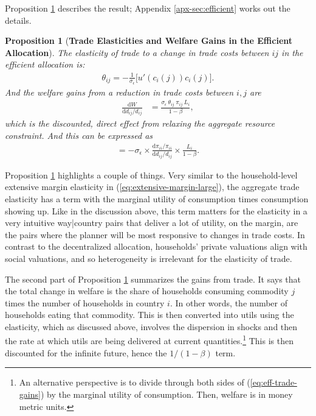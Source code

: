 \documentclass[12pt,pdftex]{article}
\newtheorem{prp}{Proposition}
\begin{document}
\begin{onehalfspacing}
Proposition \ref{prp:gains-efficient-allocation} describes the result; Appendix \ref{apx-sec:efficient} works out the details.

\begin{prp}[\textbf{Trade Elasticities and Welfare Gains in the Efficient Allocation}]\label{prp:gains-efficient-allocation} The elasticity of trade to a change in trade costs between $ij$ in the efficient allocation is:
\begin{align}
\theta_{ij} =  -\frac{1}{\sigma_{\epsilon}} \bigg [ u'(c_{i}(j)) c_{i}(j) \bigg]. \label{eq:eff-trade-elasticity}
\end{align}
And the welfare gains from a reduction in trade costs between $i,j$ are
\begin{align}
\frac{\mathrm{d} W }{\mathrm{d} d_{ij} / d_{ij}} &= \frac{\sigma_{\epsilon} \  \theta_{ij} \  \pi_{ij} \ L_i}{1-\beta},
\label{eq:eff-trade-gains}
\end{align}
which is the discounted, direct effect from relaxing the aggregate resource constraint. And this can be expressed as
\begin{align}
= -\sigma_{\epsilon} \times \frac{\mathrm{d} \pi_{ii} / \pi_{ii}}{\mathrm{d} d_{ij} / d_{ij}} \times \frac{L_i}{1 - \beta}.
\label{eq:eff-trade-gains-acr}
\end{align}
\end{prp}
Proposition \ref{prp:gains-efficient-allocation} highlights a couple of things. Very similar to the household-level extensive margin elasticity in (\ref{eq:extensive-margin-large}), the aggregate trade elasticity has a term with the marginal utility of consumption times consumption showing up. Like in the discussion above, this term matters for the elasticity in a very intuitive way|country pairs that deliver a lot of utility, on the margin, are the pairs where the planner will be most responsive to changes in trade costs. In contrast to the decentralized allocation, households' private valuations align with social valuations, and so heterogeneity is irrelevant for the elasticity of trade.

The second part of Proposition \ref{prp:gains-efficient-allocation} summarizes the gains from trade. It says that the total change in welfare is the share of households consuming commodity $j$ times the number of households in country $i$. In other words, the number of households eating that commodity. This is then converted into utils using the elasticity, which as discussed above, involves the dispersion in shocks and then the rate at which utils are being delivered at current quantities.\footnote{An alternative perspective is to divide through both sides of (\ref{eq:eff-trade-gains}) by the marginal utility of consumption. Then, welfare is in money metric units.} This is then discounted for the infinite future, hence the $1/ (1-\beta)$ term.


\end{onehalfspacing}
\end{document}

